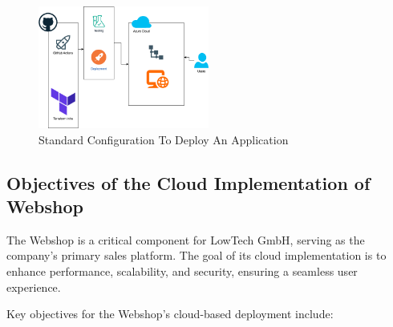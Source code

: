 \documentclass{llncs}
\begin{document}
\begin{figure}[H]
    \begin{center}
        \includegraphics[width=0.5\textwidth]{../diagrams/AppStandard.drawio.png}
        \vspace{0.01\textwidth}
        \caption{Standard Configuration To Deploy An Application}
        \label{CloudStandard} %
    \end{center}
\end{figure}


\subsection{Objectives of the Cloud Implementation of Webshop}

The Webshop is a critical component for LowTech GmbH, serving as the company’s primary sales platform. The goal of its cloud implementation is to enhance performance, scalability, and security, ensuring a seamless user experience.

Key objectives for the Webshop's cloud-based deployment include:
\end{document}
